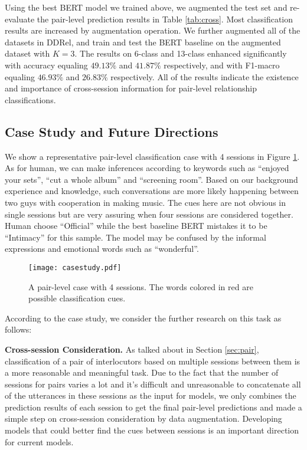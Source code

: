 \documentclass[letterpaper]{article} \usepackage{aaai21}  \usepackage{times}  \usepackage{helvet} \usepackage{courier}  \usepackage[hyphens]{url}  \usepackage{graphicx} \usepackage{xcolor}
\begin{document}
Using the best BERT model we trained above, we augmented the test set and re-evaluate the pair-level prediction results in Table \ref{tab:cross}. Most classification results are increased by augmentation operation. We further augmented all of the datasets in DDRel, and train and test the BERT baseline on the augmented dataset with $K=3$. The results on 6-class and 13-class enhanced significantly with accuracy equaling $49.13\%$ and $41.87\%$ respectively, and with F1-macro equaling $46.93\%$  and $26.83\%$ respectively. All of the results indicate the existence and importance of cross-session information for pair-level relationship classifications.




\subsection{Case Study and Future Directions}
We show a representative pair-level classification case with 4 sessions in Figure \ref{fig:case}. As for human, we can make inferences according to keywords 
such as ``enjoyed your sets'', ``cut a whole album'' and ``screening room''. Based on our background experience and knowledge, such conversations are more likely happening between two guys with cooperation in making music. The cues here are not obvious in single sessions but are very assuring when four sessions are considered together. Human choose ``Official'' while the best baseline BERT mistakes it to be ``Intimacy'' for this sample. The model may be confused by the informal expressions and emotional words such as ``wonderful''.


\begin{figure}[t!]
	\centering
	\texttt{[image: casestudy.pdf]}
	\caption{A pair-level case with 4 sessions. The words colored in red are possible classification cues. }
	\label{fig:case}
\end{figure}

According to the case study, we consider the further research on this task as follows:

\textbf{Cross-session Consideration.} As talked about in Section \ref{sec:pair}, classification of a pair of interlocutors based on multiple sessions between them is a more reasonable and meaningful task. Due to the fact that the number of sessions for pairs varies a lot and it's difficult and unreasonable to concatenate all of the utterances in these sessions as the input for models, we only combines the prediction results of each session to get the final pair-level predictions and made a simple step on cross-session consideration by data augmentation. Developing models that could better find the cues between sessions is an important direction for current models.
\end{document}
